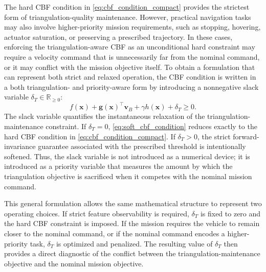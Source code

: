 \documentclass[journal]{IEEEtran}
\newcommand{\R}{\mathbb{R}}
\begin{document}
The hard CBF condition in \eqref{eq:cbf_condition_compact} provides the strictest form of triangulation-quality maintenance. However, practical navigation tasks may also involve higher-priority mission requirements, such as stopping, hovering, actuator saturation, or preserving a prescribed trajectory. In these cases, enforcing the triangulation-aware CBF as an unconditional hard constraint may require a velocity command that is unnecessarily far from the nominal command, or it may conflict with the mission objective itself. To obtain a formulation that can represent both strict and relaxed operation, the CBF condition is written in a both triangulation- and priority-aware form by introducing a nonnegative slack variable $\delta_T\in\R_{\ge0}$:
\begin{equation}
  f(\bm{x})+\bm{g}(\bm{x})^{\top}\bm{v}_{B}
  +\gamma h(\bm{x})+\delta_T \ge 0.
  \label{eq:soft_cbf_condition}
\end{equation}
The slack variable quantifies the instantaneous relaxation of the triangulation-maintenance constraint. If $\delta_T=0$, \eqref{eq:soft_cbf_condition} reduces exactly to the hard CBF condition in \eqref{eq:cbf_condition_compact}. If $\delta_T>0$, the strict forward-invariance guarantee associated with the prescribed threshold is intentionally softened. Thus, the slack variable is not introduced as a numerical device; it is introduced as a priority variable that measures the amount by which the triangulation objective is sacrificed when it competes with the nominal mission command.

This general formulation allows the same mathematical structure to represent two operating choices. If strict feature observability is required, $\delta_T$ is fixed to zero and the hard CBF constraint is imposed. If the mission requires the vehicle to remain closer to the nominal command, or if the nominal command encodes a higher-priority task, $\delta_T$ is optimized and penalized. The resulting value of $\delta_T$ then provides a direct diagnostic of the conflict between the triangulation-maintenance objective and the nominal mission objective.
\end{document}
